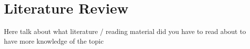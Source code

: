 \section{Literature Review}\label{sec:litrature_rev}
Here talk about what literature / reading material did 
you have to read about to have more knowledge of the topic
